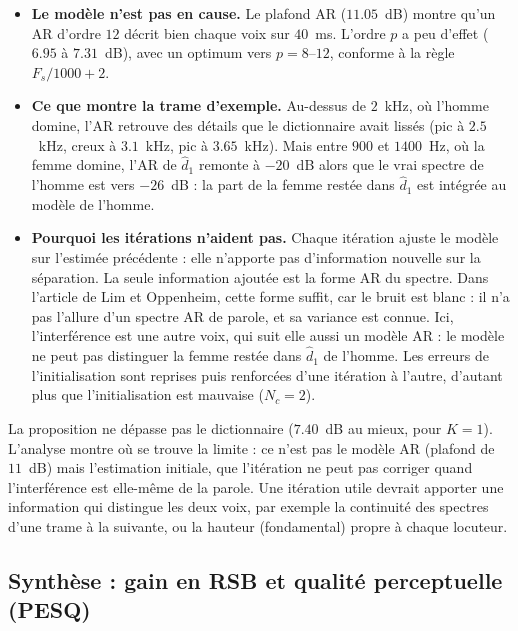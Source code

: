 \begin{interpretation}
\begin{itemize}
  \item \textbf{Le modèle n'est pas en cause.} Le plafond AR ($11.05$~dB) montre qu'un AR d'ordre $12$ décrit bien chaque voix sur $40$~ms. L'ordre $p$ a peu d'effet ($6.95$ à $7.31$~dB), avec un optimum vers $p=8$--$12$, conforme à la règle $F_s/1000+2$.
  \item \textbf{Ce que montre la trame d'exemple.} Au-dessus de $2$~kHz, où l'homme domine, l'AR retrouve des détails que le dictionnaire avait lissés (pic à $2.5$~kHz, creux à $3.1$~kHz, pic à $3.65$~kHz). Mais entre $900$ et $1400$~Hz, où la femme domine, l'AR de $\hat d_1$ remonte à $-20$~dB alors que le vrai spectre de l'homme est vers $-26$~dB : la part de la femme restée dans $\hat d_1$ est intégrée au modèle de l'homme.
  \item \textbf{Pourquoi les itérations n'aident pas.} Chaque itération ajuste le modèle sur l'estimée précédente : elle n'apporte pas d'information nouvelle sur la séparation. La seule information ajoutée est la forme AR du spectre. Dans l'article de Lim et Oppenheim, cette forme suffit, car le bruit est blanc : il n'a pas l'allure d'un spectre AR de parole, et sa variance est connue. Ici, l'interférence est une autre voix, qui suit elle aussi un modèle AR : le modèle ne peut pas distinguer la femme restée dans $\hat d_1$ de l'homme. Les erreurs de l'initialisation sont reprises puis renforcées d'une itération à l'autre, d'autant plus que l'initialisation est mauvaise ($N_c=2$).
\end{itemize}
\end{interpretation}

\begin{resultat}[Conclusion]
La proposition ne dépasse pas le dictionnaire ($7.40$~dB au mieux, pour $K=1$). L'analyse montre où se trouve la limite : ce n'est pas le modèle AR (plafond de $11$~dB) mais l'estimation initiale, que l'itération ne peut pas corriger quand l'interférence est elle-même de la parole. Une itération utile devrait apporter une information qui distingue les deux voix, par exemple la continuité des spectres d'une trame à la suivante, ou la hauteur (fondamental) propre à chaque locuteur.
\end{resultat}

\subsection{Synthèse : gain en RSB et qualité perceptuelle (PESQ)}

